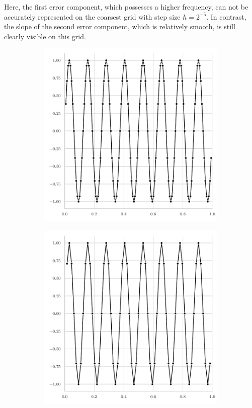 Here, the first error component, which possesses a higher frequency, can not be accurately represented on the coarsest grid with step size $h = 2^{-5}$.
In contrast, the slope of the second error component, which is relatively smooth, is still clearly visible on this grid. 
\begin{figure}
	\begin{subfigure}[b]{0.32\textwidth}
		\centering
		\includegraphics[width=\textwidth]{figures/error_plots//initial_error_16pi_level7.pdf}
	\end{subfigure}
	\hfill
	\begin{subfigure}[b]{0.32\textwidth}
		\centering
		\includegraphics[width=\textwidth]{figures/error_plots//initial_error_16pi_level6.pdf}

\end{subfigure}
\end{figure}
